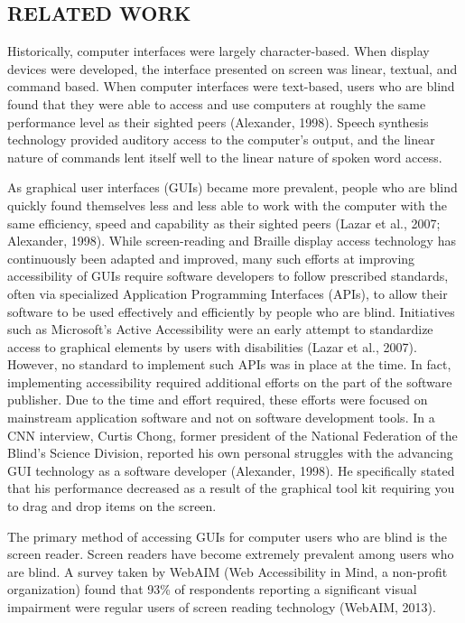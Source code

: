 \documentclass[11.5pt]{sig-alternate} %
\begin{document}
\begin{large}
\section*{RELATED WORK}

Historically, computer interfaces were largely character-based. When display devices were developed, the interface presented on screen was linear, textual, and command based. When computer interfaces were text-based, users who are blind found that they were able to access and use computers at roughly the same performance level as their sighted peers (Alexander, 1998). Speech synthesis technology provided auditory access to the computer’s output, and the linear nature of commands lent itself well to the linear nature of spoken word access.

As graphical user interfaces (GUIs) became more prevalent, people who are blind quickly found themselves less and less able to work with the computer with the same efficiency, speed and capability as their sighted peers (Lazar et al., 2007; Alexander, 1998). While screen-reading and Braille display access technology has continuously been adapted and improved, many such efforts at improving accessibility of GUIs require software developers to follow prescribed standards, often via specialized Application Programming Interfaces (APIs), to allow their software to be used effectively and efficiently by people who are blind. Initiatives such as Microsoft’s Active Accessibility were an early attempt to standardize access to graphical elements by users with disabilities (Lazar et al., 2007). However, no standard to implement such APIs was in place at the time. In fact, implementing accessibility required additional efforts on the part of the software publisher. Due to the time and effort required, these efforts were focused on mainstream application software and not on software development tools. In a CNN interview, Curtis Chong, former president of the National Federation of the Blind’s Science Division, reported his own personal struggles with the advancing GUI technology as a software developer (Alexander, 1998). He specifically stated that his performance decreased as a result of the graphical tool kit requiring you to drag and drop items on the screen.

The primary method of accessing GUIs for computer users who are blind is the screen reader. Screen readers have become extremely prevalent among users who are blind. A survey taken by WebAIM (Web Accessibility in Mind, a non-profit organization) found that 93\% of respondents reporting a significant visual impairment were regular users of screen reading technology (WebAIM, 2013).


\end{large}
\end{document}
